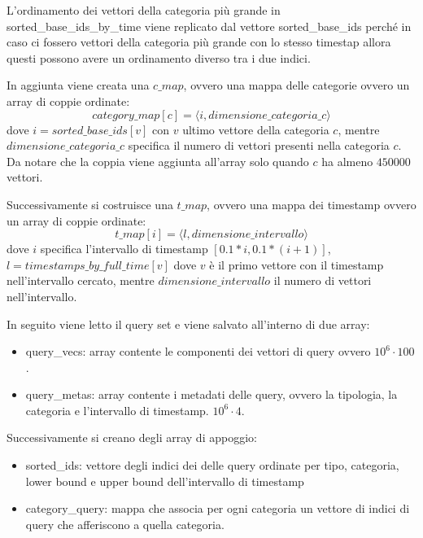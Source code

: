 \begin{nota}
    L'ordinamento dei vettori della categoria più grande in sorted\_base\_ids\_by\_time 
    viene replicato dal vettore sorted\_base\_ids perché in caso ci fossero vettori 
    della categoria più grande con lo stesso timestap allora questi possono avere 
    un ordinamento diverso tra i due indici.
\end{nota}

In aggiunta viene creata una $c\_map$, ovvero una mappa delle categorie ovvero 
un array di coppie ordinate:
\begin{equation}
    category\_map[c] = \langle i, dimensione\_categoria\_c\rangle
\end{equation} 
dove $i = sorted\_base\_ids[v]$ con $v$ ultimo vettore della categoria $c$, 
mentre $dimensione\_categoria\_c$ specifica il numero di vettori presenti nella 
categoria $c$. Da notare che la coppia viene aggiunta all'array solo quando $c$ 
ha almeno $450000$ vettori.

Successivamente si costruisce una $t\_map$, ovvero una mappa dei timestamp ovvero 
un array di coppie ordinate:
\begin{equation}
    t\_map[i] = \langle l, dimensione\_intervallo\rangle
\end{equation} 
dove $i$ specifica l'intervallo di timestamp $[0.1*i, 0.1*(i+1)]$, $l= timestamps\_by\_full\_time[v]$
dove $v$ è il primo vettore con il timestamp nell'intervallo cercato, mentre 
$dimensione\_intervallo$ il numero di vettori nell'intervallo.

In seguito viene letto il query set e viene salvato all'interno di due array:
\begin{itemize}
    \item query\_vecs: array contente le componenti dei vettori di query ovvero 
    $10^6 \cdot 100$.
    \item query\_metas: array contente i metadati delle query, ovvero la tipologia,
    la categoria e l'intervallo di timestamp.
    $10^6 \cdot 4$.
\end{itemize}

Successivamente si creano degli array di appoggio:
\begin{itemize}
    \item sorted\_ids: vettore degli indici dei delle query ordinate per tipo, 
    categoria, lower bound e upper bound dell'intervallo di timestamp
    \item category\_query: mappa che associa per ogni categoria un vettore di 
    indici di query che afferiscono a quella categoria.
\end{itemize}

